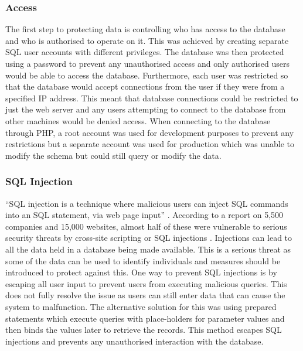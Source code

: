 \subsubsection{Access}
The first step to protecting data is controlling who has access to the database and who is authorised to operate on it. This was achieved by creating separate SQL user accounts with different privileges. The database was then protected using a password to prevent any unauthorised access and only authorised users would be able to access the database. Furthermore, each user was restricted so that the database would accept connections from the user if they were from a specified IP address. This meant that database connections could be restricted to just the web server and any users attempting to connect to the database from other machines would be denied access. When connecting to the database through PHP, a root account was used for development purposes to prevent any restrictions but a separate account was used for production which was unable to modify the schema but could still query or modify the data.

\subsubsection{SQL Injection}
``SQL injection is a technique where malicious users can inject SQL commands into an SQL statement, via web page input'' \cite{W3Schools:SQL_Injection}. According to a report on 5,500 companies and 15,000 websites, almost half of these were vulnerable to serious security threats by cross-site scripting or SQL injections \cite{FirstPost:Vulnerabilities}. Injections can lead to all the data held in a database being made available. This is a serious threat as some of the data can be used to identify individuals and measures should be introduced to protect against this. One way to prevent SQL injections is by escaping all user input to prevent users from executing malicious queries. This does not fully resolve the issue as users can still enter data that can cause the system to malfunction. The alternative solution for this was using prepared statements which execute queries with place-holders for parameter values and then binds the values later to retrieve the records. This method escapes SQL injections and prevents any unauthorised interaction with the database.


